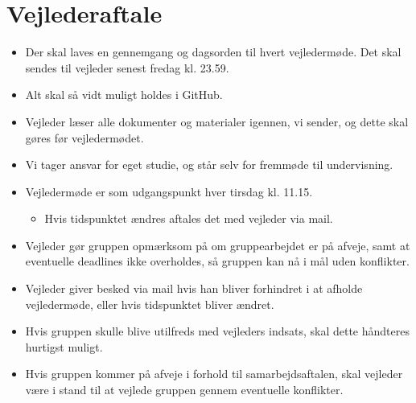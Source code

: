 \section{Vejlederaftale} \label{vejlederaftale}
\begin{itemize}
    \item Der skal laves en gennemgang og dagsorden til hvert vejledermøde. Det skal sendes til vejleder senest fredag kl. 23.59.
    \item Alt skal så vidt muligt holdes i GitHub.
    \item Vejleder læser alle dokumenter og materialer igennen, vi sender, og dette skal gøres før vejledermødet.
    \item Vi tager ansvar for eget studie, og står selv for fremmøde til undervisning.
    \item Vejledermøde er som udgangspunkt hver tirsdag kl. 11.15.
    \begin{itemize}
        \item Hvis tidspunktet ændres aftales det med vejleder via mail.
    \end{itemize}
    \item Vejleder gør gruppen opmærksom på om gruppearbejdet er på afveje, samt at eventuelle deadlines ikke overholdes, så gruppen kan nå i mål uden konflikter.
    \item Vejleder giver besked via mail hvis han bliver forhindret i at afholde vejledermøde, eller hvis tidspunktet bliver ændret.
    \item Hvis gruppen skulle blive utilfreds med vejleders indsats, skal dette håndteres hurtigst muligt.
    \item Hvis gruppen kommer på afveje i forhold til samarbejdsaftalen, skal vejleder være i stand til at vejlede gruppen gennem eventuelle konflikter.
\end{itemize}